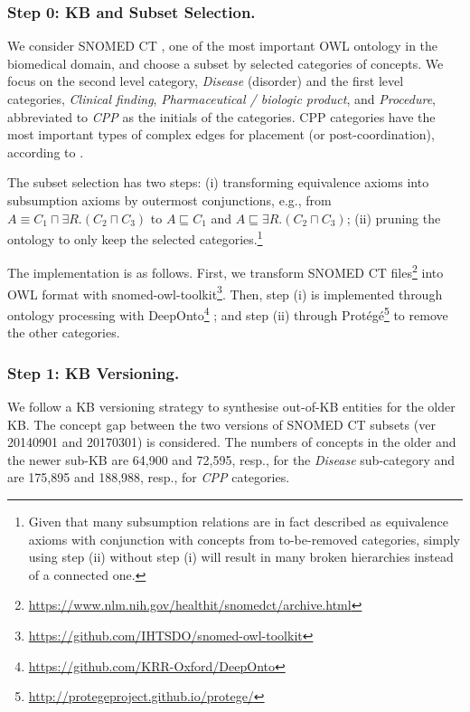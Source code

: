 \documentclass[sigconf]{acmart}
\begin{document}
\subsubsection*{Step 0: KB and Subset Selection.}
We consider SNOMED CT \cite{donnelly2006snomed}, one of the most important OWL ontology in the biomedical domain, and choose a subset by selected categories of concepts. We focus on the second level category, \textit{Disease} (disorder) and the first level categories, \textit{Clinical finding}, \textit{Pharmaceutical / biologic product}, and \textit{Procedure}, abbreviated to \textit{CPP} as the initials of the categories. CPP categories have the most important types of complex edges for placement (or post-coordination), according to \citet{kate2020}.

The subset selection has two steps: (i) transforming equivalence axioms into subsumption axioms by outermost conjunctions, e.g., from $A \equiv C_1 \sqcap \exists R.(C_2 \sqcap C_3)$ to $A \sqsubseteq C_1$ and $A \sqsubseteq \exists R.(C_2 \sqcap C_3)$; (ii) pruning the ontology to only keep the selected categories.\footnote{Given that many subsumption relations are in fact described as equivalence axioms with conjunction with concepts from to-be-removed categories, simply using step (ii) without step (i) will result in many broken hierarchies instead of a connected one.}

The implementation is as follows. First, we transform SNOMED CT files\footnote{\url{https://www.nlm.nih.gov/healthit/snomedct/archive.html}} into OWL format with snomed-owl-toolkit\footnote{\url{https://github.com/IHTSDO/snomed-owl-toolkit}}. Then, step (i) is implemented through ontology processing with DeepOnto\footnote{\url{https://github.com/KRR-Oxford/DeepOnto}} \cite{he2023deeponto}; and step (ii) through Protégé\footnote{\url{http://protegeproject.github.io/protege/}} to remove the other categories.

\subsubsection*{Step 1: KB Versioning.}
We follow a KB versioning strategy \cite{dong2023NIL,Iurshina2022nilk} to synthesise out-of-KB entities for the older KB. The concept gap between the two versions of SNOMED CT subsets (ver 20140901 and 20170301) is considered. The numbers of concepts in the older and the newer sub-KB are 64,900 and 72,595, resp., for the \textit{Disease} sub-category and are 175,895 and 188,988, resp., for \textit{CPP} categories.
\end{document}
